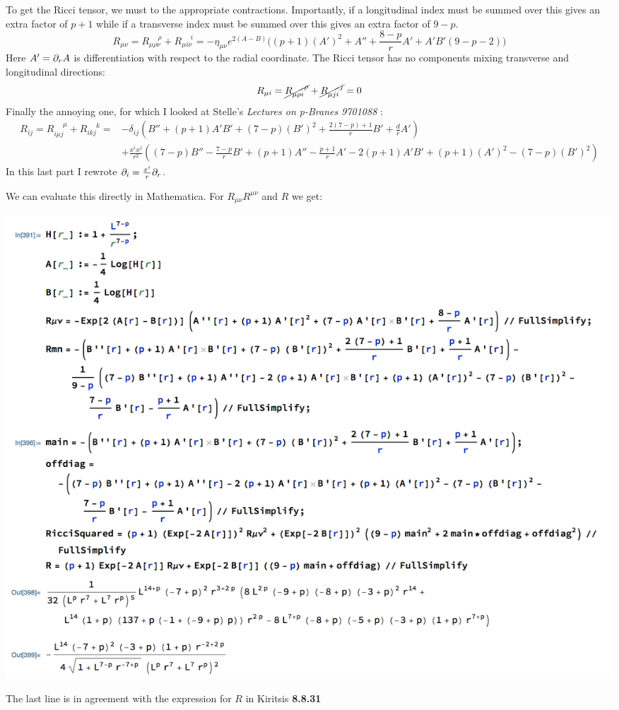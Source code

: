 \documentclass[11pt, class=article, crop=false]{standalone}
\begin{document}
\begin{enumerate}
	To get the Ricci tensor, we must to the appropriate contractions. Importantly, if a longitudinal index must be summed over this gives an extra factor of $p+1$ while if a transverse index must be summed over this gives an extra factor of $9-p$.
	\[
		R_{\mu \nu} = R_{\mu \rho \nu}^{\; \quad \rho} + R_{\mu i \nu}^{\; \quad i} = - \eta_{\mu \nu} e^{2(A-B)} \Big( (p+1) (A')^2 + A'' + \frac{8-p}{r} A' + A' B' (9-p - 2) \Big)
	\]
	Here $A' = \partial_r A$ is differentiation with respect to the radial coordinate. The Ricci tensor has no components mixing transverse and longitudinal directions: 
	\[
		R_{\mu i} = \cancel{R_{\mu \rho i}^{\; \quad \rho}} + \cancel{ R_{\mu j i}^{\; \quad j}} = 0 
	\]
	Finally the annoying one, for which I looked at Stelle's \emph{Lectures on p-Branes 9701088} : 
	\[
	\begin{aligned}
		R_{ij} = R_{i \mu j}^{\; \quad \mu} + R_{i k j}^{\; \quad k} = & {\textstyle - \delta_{ij} \left(B'' + (p+1) A' B' + (7-p) (B')^2 + \frac{2 (7-p) + 1}{r} B' + \frac{d}{r} A'  \right)}\\
		& \textstyle + \frac{x^i x^j}{r^2} \left( \scriptstyle(7-p) B'' - \frac{7-p}{r} B' + (p+1)A'' - \frac{p+1}{r} A' - 2 (p+1) A' B' + (p+1) (A')^2 - (7-p) (B')^2 \right)
	\end{aligned}
	\]
	In this last part I rewrote $\partial_i = \frac{x^i}{r} \partial_r$.
	
	We can evaluate this directly in Mathematica. For $R_{\mu \nu} R^{\mu \nu}$ and $R$ we get:
	\begin{center}
		\includegraphics[scale=0.5]{"Figures/Curvature Invariants"}
	\end{center}
	The last line is in agreement with the expression for $R$ in Kiritsis \textbf{8.8.31}
	

\end{enumerate}
\end{document}
